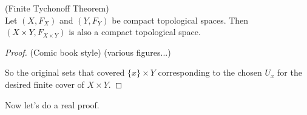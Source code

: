 \begin{theorem} (Finite Tychonoff Theorem) \\
Let $(X,F_X)$ and $(Y,F_Y)$ be compact topological spaces.  Then $(X \times Y, F_{X \times Y})$ is also a compact topological space.
\end{theorem}
\begin{proof} (Comic book style)
(various figures...)
\placeholder

So the original sets that covered $\{x\} \times Y$ corresponding to the chosen $U_x$ for the desired finite cover of $X \times Y$.
\end{proof}
Now let's do a real proof.
